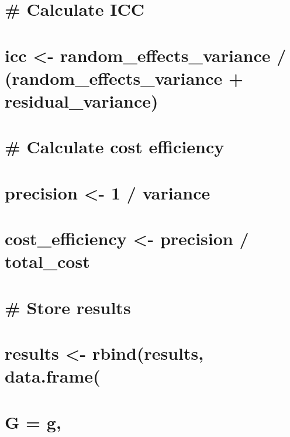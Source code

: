 \documentclass[
]{article}
\begin{document}
\hypertarget{calculate-icc}{%
\section{\# Calculate ICC}\label{calculate-icc}}

\hypertarget{icc---random_effects_variance-random_effects_variance-residual_variance}{%
\section{icc \textless- random\_effects\_variance /
(random\_effects\_variance +
residual\_variance)}\label{icc---random_effects_variance-random_effects_variance-residual_variance}}

\hypertarget{calculate-cost-efficiency}{%
\section{\# Calculate cost efficiency}\label{calculate-cost-efficiency}}

\hypertarget{precision---1-variance}{%
\section{precision \textless- 1 /
variance}\label{precision---1-variance}}

\hypertarget{cost_efficiency---precision-total_cost}{%
\section{cost\_efficiency \textless- precision /
total\_cost}\label{cost_efficiency---precision-total_cost}}

\hypertarget{store-results}{%
\section{\# Store results}\label{store-results}}

\hypertarget{results---rbindresults-data.frame}{%
\section{results \textless- rbind(results,
data.frame(}\label{results---rbindresults-data.frame}}

\hypertarget{g-g}{%
\section{G = g,}\label{g-g}}
\end{document}
